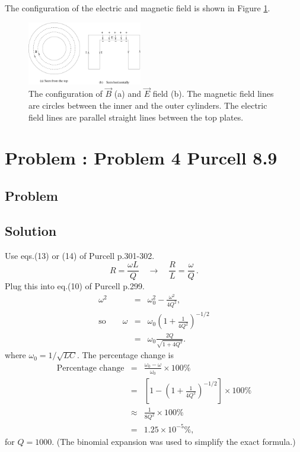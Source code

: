 \documentclass[solutions]{esg8022pset}
\begin{document}
The configuration of the electric and magnetic field is shown in
Figure \ref{fig:cavity2}.

\begin{figure}[H]
    \centering
    \includegraphics[width = 5cm]{cavity2}
    \caption{The configuration of $\vec{B}$ (a) and $\vec{E}$ field (b).
The magnetic field lines are circles between the inner and the outer
cylinders.  The electric field lines are parallel straight lines
between the top plates.}
    \label{fig:cavity2}
  \end{figure}


\section{Problem \thesection: Problem 4 Purcell 8.9}
\subsection{Problem}
\subsection{Solution}
Use eqs.(13) or (14) of Purcell p.301-302.
\begin{equation}
R=\frac{\omega L}{Q} \quad\to\quad \frac{R}{L}=\frac{\omega}{Q}\,.
\end{equation}
Plug this into eq.(10) of Purcell p.299.
\begin{eqnarray}
\omega^2 &=& \omega_0^2-\frac{\omega^2}{4Q^2},\\
\textrm{so} \qquad \omega &=& \omega_0 \left(1+\frac{1}{4Q^2}\right)^{-1/2}\\
&=& \omega_0\frac{2Q}{\sqrt{1+4Q^2}}.
\end{eqnarray}
where $\omega_0=1/\sqrt{LC}$.  The percentage change is
\begin{eqnarray}
\textrm{Percentage change} &=& \frac{\omega_0-\omega}{\omega_0}\times
100\%\nonumber\\
&=& \left[1-\left(1+\frac{1}{4Q^2}\right)^{-1/2}\right]\times 100\%\nonumber\\
&\approx & \frac{1}{8Q^2}\times 100\%\nonumber\\
&=& 1.25\times 10^{-5} \%,
\end{eqnarray}
for $Q=1000$.  (The binomial expansion was used to simplify the exact formula.)
\end{document}
